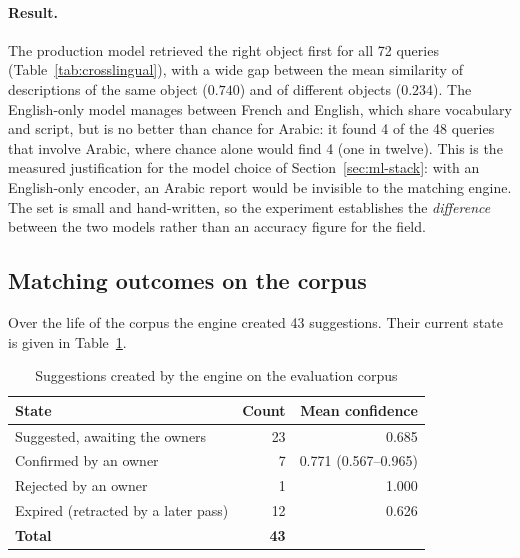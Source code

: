 \paragraph{Result.} The production model retrieved the right object first for
all 72 queries (Table~\ref{tab:crosslingual}), with a wide gap between the mean similarity of descriptions of
the same object ($0.740$) and of different objects ($0.234$). The English-only
model manages between French and English, which share vocabulary and script,
but is no better than chance for Arabic: it found 4 of the 48 queries that
involve Arabic, where chance alone would find 4 (one in twelve). This is the
measured justification for the model choice of Section~\ref{sec:ml-stack}: with
an English-only encoder, an Arabic report would be invisible to the matching
engine. The set is small and hand-written, so the experiment establishes the
\emph{difference} between the two models rather than an accuracy figure for the
field.

\subsection{Matching outcomes on the corpus}
\label{sec:eval-matching}

Over the life of the corpus the engine created 43 suggestions. Their current
state is given in Table~\ref{tab:match-outcomes}.

\begin{table}[htbp]
\centering
\caption{Suggestions created by the engine on the evaluation corpus}
\label{tab:match-outcomes}
\small
\begin{tabularx}{\textwidth}{@{}X r r@{}}
\toprule
\textbf{State} & \textbf{Count} & \textbf{Mean confidence} \\
\midrule
Suggested, awaiting the owners          & 23 & 0.685 \\
Confirmed by an owner                   & 7  & 0.771 {\footnotesize (0.567--0.965)} \\
Rejected by an owner                    & 1  & 1.000 \\
Expired (retracted by a later pass)     & 12 & 0.626 \\
\midrule
\textbf{Total}                          & \textbf{43} & \\
\bottomrule
\end{tabularx}
\end{table}

